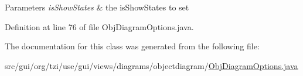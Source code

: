 \begin{DoxyParams}{Parameters}
{\em is\-Show\-States} & the is\-Show\-States to set \\
\hline
\end{DoxyParams}


Definition at line 76 of file Obj\-Diagram\-Options.\-java.



The documentation for this class was generated from the following file\-:\begin{DoxyCompactItemize}
\item 
src/gui/org/tzi/use/gui/views/diagrams/objectdiagram/\hyperlink{_obj_diagram_options_8java}{Obj\-Diagram\-Options.\-java}\end{DoxyCompactItemize}
